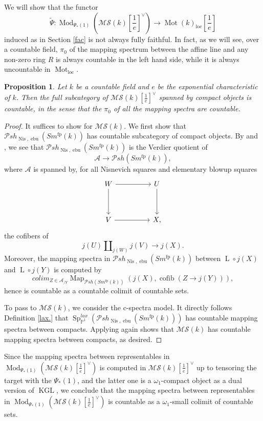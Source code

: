 \documentclass{article}
\newtheorem{prop}[thm]{Proposition}
\theoremstyle{definition}
\newcommand{\on}{\operatorname}
\begin{document}
We will show that the functor\[
\widetilde{\Psi}:\on{Mod}_{\Psi_\ast(1)}(\mathcal{MS}(k)[\frac{1}{e}]^\vee)\rightarrow\on{Mot}(k)_{\on{loc}}[\frac{1}{e}]\]
induced as in Section \ref{fac} is not always fully faithful. In fact, as we will see, over a countable field, $\pi_0$ of the mapping spectrum between the affine line and any non-zero ring $R$ is always countable in the left hand side, while it is always uncountable in $\on{Mot}_{\on{loc}}$.
\begin{prop}\label{countability}
Let $k$ be a countable field and $e$ be the exponential characteristic of $k$. Then the full subcategory of $\mathcal{MS}(k)[\frac{1}{e}]^\vee$ spanned by compact objects is countable, in the sense that the $\pi_0$ of all the mapping spectra are countable.
\end{prop}
\begin{proof}
It suffices to show for $\mathcal{MS}(k)$. We first show that $\mathcal{P}sh_{\on{Nis},\on{ebu}}(Sm^{\on{fp}}(k))$ has countable subcategory of compact objects. By \cite[Theorem I.3.3]{NS} and \cite[Proposition 5.6]{BGT}, we see that $\mathcal{P}sh_{\on{Nis},\on{ebu}}(Sm^{\on{fp}}(k))$ is the Verdier quotient of\[\mathcal{A}\rightarrow\mathcal{P}sh(Sm^{\on{fp}}(k)),\]
where $\mathcal{A}$ is spanned by, for all Nisnevich squares and elementary blowup squares\[\begin{tikzcd}
	W && U \\
	\\
	V && X
	\arrow[from=1-1, to=1-3]
	\arrow[from=1-1, to=3-1]
	\arrow[from=1-3, to=3-3]
	\arrow[from=3-1, to=3-3],
\end{tikzcd}\]
the cofibers of\[
j(U)\amalg_{j(W)}j(V)\rightarrow j(X).\]
Moreover, the mapping spectra in $\mathcal{P}sh_{\on{Nis},\on{ebu}}(Sm^{\on{fp}}(k))$ between $\on{L}\circ j(X)$ and $\on{L}\circ j(Y)$ is computed by\[
colim_{Z \in \mathcal{A}_{/ Y}} \operatorname{Map}_{\mathcal{P}sh(Sm^{\on{fp}}(k))}(j(X), \operatorname{cofib}(Z \rightarrow j(Y))),\]
hence is countable as a countable colimit of countable sets.

To pass to $\mathcal{MS}(k)$, we consider the c-spectra model. It directly follows Definition \ref{lax.} that $\on{Sp}^{lax}_{\mathbb{P}^1}(\mathcal{P}sh_{\on{Nis},\on{ebu}}(Sm^{\on{fp}}(k)))$ has countable mapping spectra between compacts. Applying \cite[Theorem I.3.3]{NS} again shows that $\mathcal{MS}(k)$ has countable mapping spectra between compacts, as desired.
\end{proof}


Since the mapping spectra between representables in $\on{Mod}_{\Psi_\ast(1)}(\mathcal{MS}(k)[\frac{1}{e}]^\vee)$ is computed in $\mathcal{MS}(k)[\frac{1}{e}]^\vee$ up to tensoring the target with the $\Psi_\ast(1)$, and the latter one is a $\omega_1$-compact object as a dual version of $\on{KGL}$, we conclude that the mapping spectra between representables in $\on{Mod}_{\Psi_\ast(1)}(\mathcal{MS}(k)[\frac{1}{e}]^\vee)$ is countable as a $\omega_1$-small colimit of countable sets.
\end{document}
